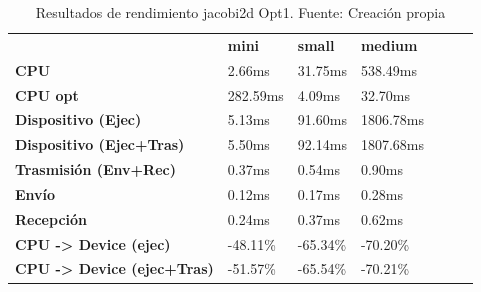 \begin{table}[H]
    \centering
    \begin{tabular}{lllllll}
    \rowcolor[HTML]{DAE8FC} \ &  \textbf{mini} &  \textbf{	small} &  \textbf{	medium} \\
    \cellcolor[HTML]{DAE8FC} \textbf{CPU} & 2.66ms & 	31.75ms & 	538.49ms \\
    \rowcolor[HTML]{EFEFEF} \cellcolor[HTML]{DAE8FC} \textbf{CPU opt} & 282.59ms & 	4.09ms & 	32.70ms \\
    \cellcolor[HTML]{DAE8FC} \textbf{Dispositivo (Ejec)} & 5.13ms & 	91.60ms & 	1806.78ms \\
    \rowcolor[HTML]{EFEFEF} \cellcolor[HTML]{DAE8FC} \textbf{Dispositivo (Ejec+Tras)} & 5.50ms & 	92.14ms & 	1807.68ms \\
    \cellcolor[HTML]{DAE8FC} \textbf{Trasmisión (Env+Rec)} & 0.37ms & 	0.54ms & 	0.90ms \\
    \rowcolor[HTML]{EFEFEF} \cellcolor[HTML]{DAE8FC} \textbf{Envío} & 0.12ms & 	0.17ms & 	0.28ms \\
    \cellcolor[HTML]{DAE8FC} \textbf{Recepción} & 0.24ms & 	0.37ms & 	0.62ms \\
    \rowcolor[HTML]{EFEFEF} \cellcolor[HTML]{DAE8FC} \textbf{CPU -> Device (ejec)} & -48.11\% & 	-65.34\% & 	-70.20\% \\
    \cellcolor[HTML]{DAE8FC} \textbf{CPU -> Device (ejec+Tras)} & -51.57\% & 	-65.54\% & 	-70.21\% \\
    \end{tabular}
    \caption[Resultados de rendimiento jacobi2d Opt1]{{Resultados de rendimiento jacobi2d Opt1. Fuente: Creación propia}}
    \label{table_test_jacobi2d_Opt1_hw_performanceResults}
\end{table}